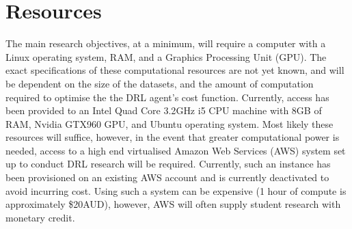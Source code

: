 \section{Resources}
The main research objectives, at a minimum, will require a computer with a Linux operating system, RAM, and a Graphics Processing Unit (GPU). The exact specifications of these computational resources are not yet known, and will be dependent on the size of the datasets, and the amount of computation required to optimise the the DRL agent's cost function. Currently, access has been provided to an Intel Quad Core 3.2$\si{\giga\hertz}$ i5 CPU machine with 8GB of RAM, Nvidia GTX960 GPU, and Ubuntu operating system. Most likely these resources will suffice, however, in the event that greater computational power is needed, access to a high end virtualised Amazon Web Services (AWS) system set up to conduct DRL research will be required. Currently, such an instance has been provisioned on an existing AWS account and is currently deactivated to avoid incurring cost. Using such a system can be expensive (1 hour of compute is approximately \$20AUD), however, AWS will often supply student research with monetary credit.\\

%	
%	
